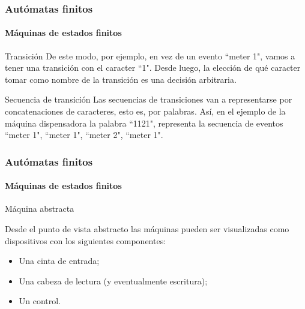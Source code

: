 \documentclass{beamer}
\begin{document}
        \begin{frame}
			\frametitle{Aut\'omatas finitos}
			\framesubtitle{M\'aquinas de estados finitos}

            \begin{block}{Transici\'on}
                De este modo, por ejemplo, en vez de un evento ``meter 1", vamos a tener una transici\'on con el caracter ``1". Desde luego, la elecci\'on de qu\'e caracter tomar como nombre de la transici\'on es una decisi\'on arbitraria.
            \end{block}
            \begin{block}{Secuencia de transici\'on}
                Las secuencias de transiciones van a representarse por concatenaciones de caracteres, esto es, por palabras. As\'i, en el ejemplo de la m\'aquina dispensadora la palabra ``1121", representa la secuencia de eventos ``meter 1", ``meter 1", ``meter 2", ``meter 1".
            \end{block}
		\end{frame}

        \begin{frame}
			\frametitle{Aut\'omatas finitos}
			\framesubtitle{M\'aquinas de estados finitos}

            \begin{block}{M\'aquina abstracta}
                \begin{multicols}{2}
                    Desde el punto de vista abstracto las m\'aquinas pueden ser visualizadas como dispositivos con los siguientes componentes:
                    \begin{itemize}
                       \item Una cinta de entrada;
                       \item Una cabeza de lectura (y eventualmente escritura);
                       \item Un control.
                    \end{itemize}
                    \begin{center}
			        \end{center}
                \end{multicols}
            \end{block}
		\end{frame}
\end{document}
